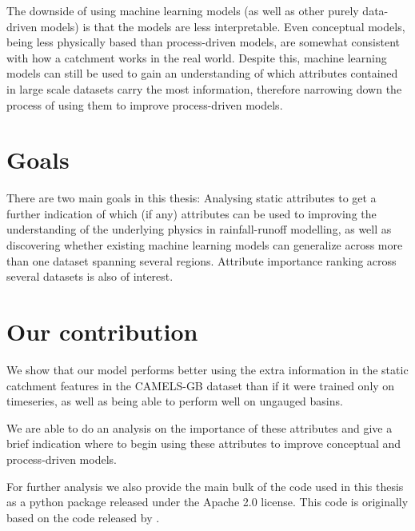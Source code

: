 The downside of using machine learning models (as well as other purely data-driven 
models) is that the models are less interpretable. Even conceptual models, being 
less physically based than process-driven models, are somewhat consistent with 
how a catchment works in the real world. Despite this, machine learning models 
can still be used to gain an understanding of which attributes contained in 
large scale datasets carry the most information, therefore narrowing down the 
process of using them to improve process-driven models.
\section{Goals}
There are two main goals in this thesis: Analysing static attributes to get a 
further indication of which (if any) attributes can be used to improving the 
understanding of the underlying physics in rainfall-runoff modelling, as well 
as discovering whether existing machine learning models can generalize across 
more than one dataset spanning several regions. Attribute importance ranking 
across several datasets is also of interest.

\section{Our contribution}
We show that our model performs better using the extra information in the static 
catchment features in the CAMELS-GB \citep{CAMELS_GB} dataset than if it were trained 
only on timeseries, as well as being able to perform well on ungauged basins.

We are able to do an analysis on the importance of these attributes and give a brief 
indication where to begin using these attributes to improve conceptual and process-driven 
models.

For further analysis we also provide the main bulk of 
the code used in this thesis as a python package released under the Apache 2.0 
license. This code is originally based on the code released by \citet{lstm_second_paper}.

